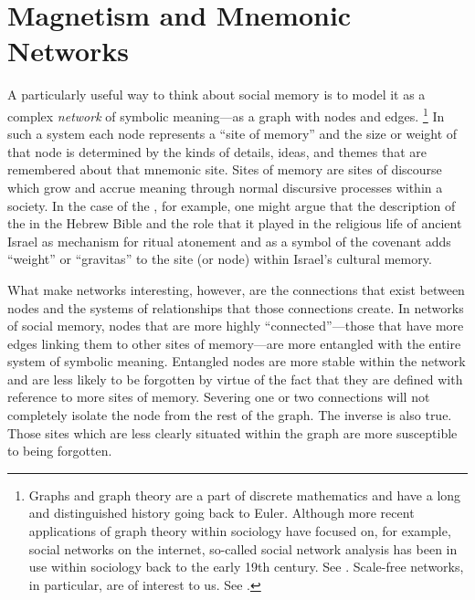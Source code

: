 \section{Magnetism and Mnemonic Networks}

A particularly useful way to think about social memory is to model it as a complex \emph{network} of symbolic meaning---as a graph with nodes and edges.%
    \footnote{Graphs and graph theory are a part of discrete mathematics and have a long and distinguished history going back to Euler. Although more recent applications of graph theory within sociology have focused on, for example, social networks on the internet, so-called social network analysis has been in use within sociology back to the early 19th century. See \cite[10--16]{linton2004}. Scale-free networks, in particular, are of interest to us. See \cite{barabasi_science2009}.}
In such a system each node represents a ``site of memory'' and the size or weight of that node is determined by the kinds of details, ideas, and themes that are remembered about that mnemonic site. Sites of memory are sites of discourse which grow and accrue meaning through normal discursive processes within a society. In the case of the \temple, for example, one might argue that the description of the \temple in the Hebrew Bible and the role that it played in the religious life of ancient Israel as mechanism for ritual atonement and as a symbol of the covenant adds ``weight'' or ``gravitas'' to the site (or node) within Israel's cultural memory. 

What make networks interesting, however, are the connections that exist between nodes and the systems of relationships that those connections create. In networks of social memory, nodes that are more highly ``connected''---those that have more edges linking them to other sites of memory---are more entangled with the entire system of symbolic meaning. Entangled nodes are more stable within the network and are less likely to be forgotten by virtue of the fact that they are defined with reference to more sites of memory. Severing one or two connections will not completely isolate the node from the rest of the graph. The inverse is also true. Those sites which are less clearly situated within the graph are more susceptible to being forgotten.

